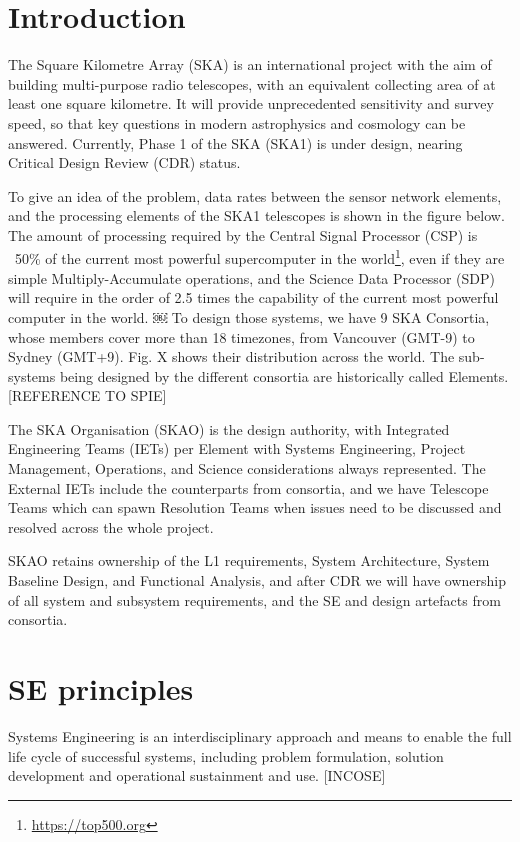 \documentclass[11pt,twoside]{article}
\begin{document}
\section{Introduction} %
\label{sec:introduction}
The Square Kilometre Array (SKA) is an international project with the aim of building multi-purpose radio telescopes, with an equivalent collecting area of at least one square kilometre. It will provide unprecedented sensitivity and survey speed, so that key questions in modern astrophysics and cosmology can be answered. Currently, Phase 1 of the SKA (SKA1) is under design, nearing Critical Design Review (CDR) status.	
	
To give an idea of the problem, data rates between the sensor network elements, and the processing elements of the SKA1 telescopes is shown in the figure below. The amount of processing required by the Central Signal Processor (CSP) is ~50\% of the current most powerful supercomputer in the world\footnote{\url{https://top500.org}}, even if they are simple Multiply-Accumulate operations, and the Science Data Processor (SDP) will require in the order of 2.5 times the capability of the current most powerful computer in the world.
￼	
To design those systems, we have 9 SKA Consortia, whose members cover more than 18 timezones, from Vancouver (GMT-9) to Sydney (GMT+9). Fig. X shows their distribution across the world. The sub-systems being designed by the different consortia are historically called Elements. [REFERENCE TO SPIE]

The SKA Organisation (SKAO) is the design authority, with Integrated Engineering Teams (IETs) per Element with Systems Engineering, Project Management, Operations, and Science considerations always represented. The External IETs include the counterparts from consortia, and we have Telescope Teams which can spawn Resolution Teams when issues need to be discussed and resolved across the whole project.

SKAO retains ownership of the L1 requirements, System Architecture, System Baseline Design, and Functional Analysis, and after CDR we will have ownership of all system and subsystem requirements, and the SE and design artefacts from consortia.


\section{SE principles} %
\label{sec:se_principles}
Systems Engineering is an interdisciplinary approach and means to enable the full life cycle of successful systems, including problem formulation, solution development and operational sustainment and use. [INCOSE]
\end{document}
